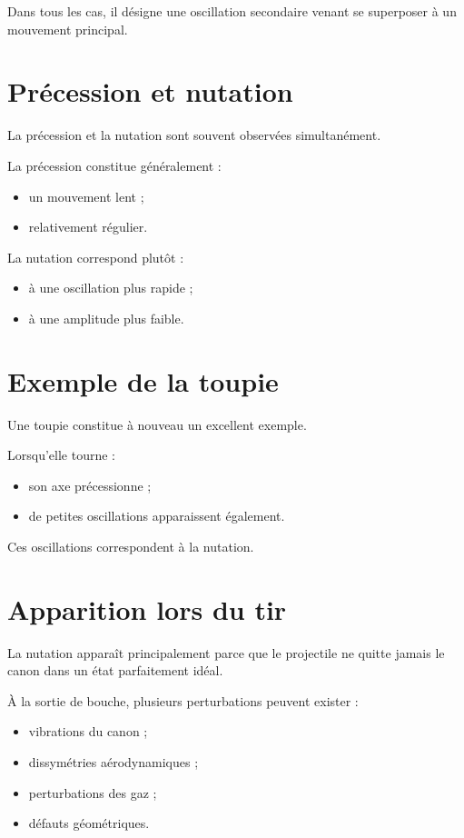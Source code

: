 Dans tous les cas, il désigne une oscillation secondaire venant se superposer
à un mouvement principal.

\section{Précession et nutation}

La précession et la nutation sont souvent observées simultanément.

La précession constitue généralement :

\begin{itemize}
    \item un mouvement lent ;
    \item relativement régulier.
\end{itemize}

La nutation correspond plutôt :

\begin{itemize}
    \item à une oscillation plus rapide ;
    \item à une amplitude plus faible.
\end{itemize}

\section{Exemple de la toupie}

Une toupie constitue à nouveau un excellent exemple.

Lorsqu'elle tourne :

\begin{itemize}
    \item son axe précessionne ;
    \item de petites oscillations apparaissent également.
\end{itemize}

Ces oscillations correspondent à la nutation.

\section{Apparition lors du tir}

La nutation apparaît principalement parce que le projectile ne quitte jamais
le canon dans un état parfaitement idéal.

À la sortie de bouche, plusieurs perturbations peuvent exister :

\begin{itemize}
    \item vibrations du canon ;
    \item dissymétries aérodynamiques ;
    \item perturbations des gaz ;
    \item défauts géométriques.
\end{itemize}

